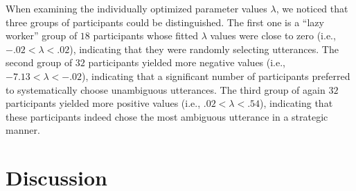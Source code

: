 \documentclass[10pt,a4paper]{article}
\newcommand{\gcs}[1]{\textcolor{blue}{[gcs: #1]}}
\begin{document}

When examining the individually optimized parameter values $\lambda$, we noticed that three groups of participants could be distinguished. 
The first one is a ``lazy worker'' group of $18$ participants whose fitted $\lambda$ values were close to zero (i.e.,  $-.02 < \lambda<.02$), indicating that they were randomly selecting utterances.
The second group of $32$ participants yielded more negative values (i.e., $-7.13<\lambda<-.02$), indicating that a significant number of participants preferred to systematically choose unambiguous utterances. 
The third group of again $32$ participants yielded more positive values (i.e., $.02<\lambda<.54$), indicating that these participants indeed chose the most ambiguous utterance in a strategic manner. 



\section*{Discussion}
\end{document}
